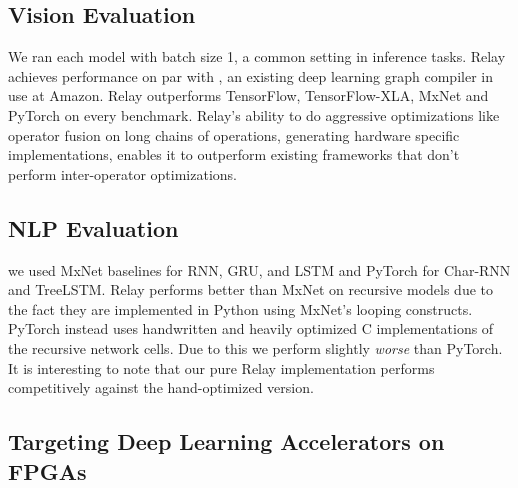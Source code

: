   \subsection{Vision Evaluation}
  We ran each model with
    batch size 1, a common setting in inference tasks.
  Relay achieves performance on par with \nnvm,
    an existing deep learning graph compiler in use at Amazon.
  Relay outperforms TensorFlow, TensorFlow-XLA, MxNet and
    PyTorch on every benchmark.
  Relay's ability to do aggressive optimizations like operator
    fusion on long chains of operations, generating hardware
    specific implementations, enables it to outperform
    existing frameworks that don't perform inter-operator optimizations.

  \subsection{NLP Evaluation}
    we used MxNet baselines for RNN, GRU, and LSTM and PyTorch for Char-RNN and TreeLSTM.
  Relay performs better than MxNet on recursive models
    due to the fact they are implemented in Python using
    MxNet's looping constructs.
  PyTorch instead uses handwritten and heavily optimized
    C implementations of the recursive network cells.
  Due to this we perform slightly \emph{worse} than PyTorch.
  It is interesting to note that our pure Relay
    implementation performs competitively against
    the hand-optimized version.

  \subsection{Targeting Deep Learning Accelerators on FPGAs}

